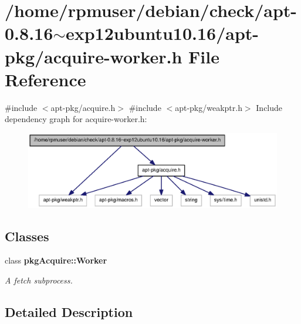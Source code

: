 \section{/home/rpmuser/debian/check/apt-\/0.8.16$\sim$exp12ubuntu10.16/apt-\/pkg/acquire-\/worker.h \-File \-Reference}
\label{acquire-worker_8h}
{\ttfamily \#include $<$apt-\/pkg/acquire.\-h$>$}\*
{\ttfamily \#include $<$apt-\/pkg/weakptr.\-h$>$}\*
\-Include dependency graph for acquire-\/worker.h\-:
\nopagebreak
\begin{figure}[H]
\begin{center}
\leavevmode
\includegraphics[width=350pt]{acquire-worker_8h__incl}
\end{center}
\end{figure}
\subsection*{\-Classes}
\begin{DoxyCompactItemize}
\item 
class {\bf pkg\-Acquire\-::\-Worker}
\begin{DoxyCompactList}\small\item\em \-A fetch subprocess. \end{DoxyCompactList}\end{DoxyCompactItemize}


\subsection{\-Detailed \-Description}
